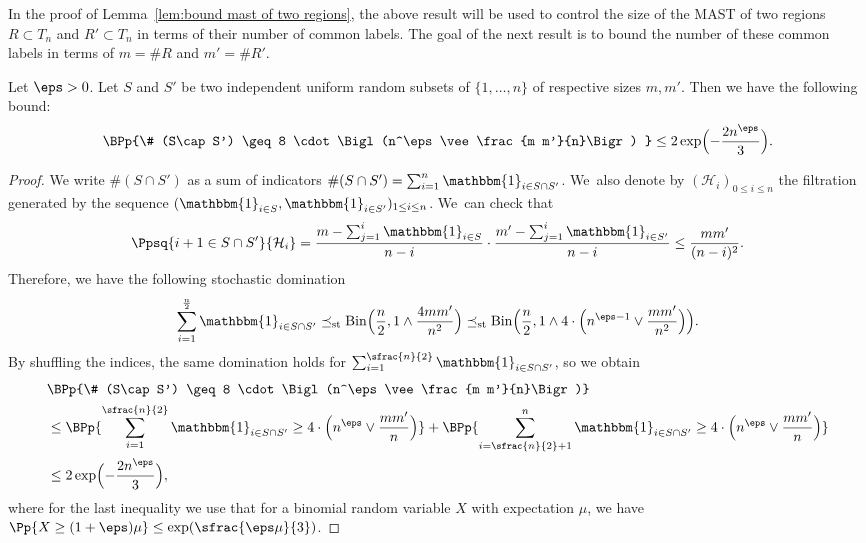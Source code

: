 In the proof of Lemma~\ref{lem:bound mast of two regions}, the above result will be used to control the size of the MAST of two regions $R\subset T_n$ and $R'\subset T_n$ in terms of their number of common labels.
The goal of the next result is to bound the number of these common labels in terms of $m=\# R$ and $m'=\# R'$.
\begin{lemma}\label{lem:size of the intersection of two indep subsets}
Let $\eps>0$.
Let $S$ and $S'$ be two independent uniform random subsets of $\{1,\dots,n\}$ of respective sizes $m,m'$. Then we have the following bound:
\begin{align*}
\BPp{\# (S\cap S') \geq 8 \cdot \Bigl(n^\eps\vee\frac{m m'}{n}\Bigr) } \leq 2\exp \Bigl(-\frac{2n^\eps}{3}\Bigr).
\end{align*}
\end{lemma}
\begin{proof}
We write $\# (S\cap S')$ as a sum of indicators $\# (S\cap S')=\sum_{i=1}^{n}\mathbbm{1}_{i\in S\cap S'}$. We~also denote by $(\mathcal H_i)_{0\leq i \leq n}$ the filtration generated by the sequence $(\mathbbm{1}_{i\in S},\mathbbm{1}_{i\in S'})_{1\leq i \leq n}$. We~can check that
\begin{align*}
\Ppsq{i+1\in S\cap S'}{\mathcal H_{i}}= \frac{m-\sum_{j=1}^{i}\mathbbm{1}_{i\in S}}{n-i} \cdot \frac{m'-\sum_{j=1}^{i}\mathbbm{1}_{i\in S'}}{n-i} \leq \frac{mm'}{(n-i)^2}.
\end{align*}
Therefore, we have the following stochastic domination
\begin{align*}
\sum_{i=1}^{\frac{n}{2}} \mathbbm{1}_{i\in S\cap S'} \preceq_{\mathrm{st}} \mathrm{Bin}\Bigl(\frac{n}{2},1 \wedge \frac{4mm'}{n^2}\Bigr)\preceq_{\mathrm{st}} \mathrm{Bin}\Bigl(\frac{n}{2},1\wedge 4\cdot \Bigl(n^{\eps -1} \vee \frac{mm'}{n^2}\Bigr) \Bigr).
\end{align*}
By shuffling the indices, the same domination holds for $\sum_{i=1}^{\sfrac{n}{2}} \mathbbm{1}_{i\in S\cap S'}$, so we obtain
\begin{align*}
&\BPp{\# (S\cap S') \geq 8 \cdot \Bigl(n^\eps\vee\frac{m m'}{n}\Bigr)}\\
&\leq \BPp{\sum_{i=1}^{\sfrac{n}{2}} \mathbbm{1}_{i\in S\cap S'}\geq 4 \cdot \Bigl(n^\eps\vee\frac{m m'}{n}\Bigr)}
+\BPp{\sum_{i=\sfrac{n}{2}+1}^n \mathbbm{1}_{i\in S\cap S'}\geq 4 \cdot \Bigl(n^\eps\vee\frac{m m'}{n}\Bigr)} \\
&\leq 2 \exp\Bigl(-\frac{2n^\eps}{3}\Bigr),
\end{align*}
where for the last inequality we use that for a binomial random variable $X$ with expectation $\mu$, we have $\Pp{X\geq (1+\eps)\mu}\leq \exp(\sfrac{\eps \mu }{3})$.
\end{proof}
